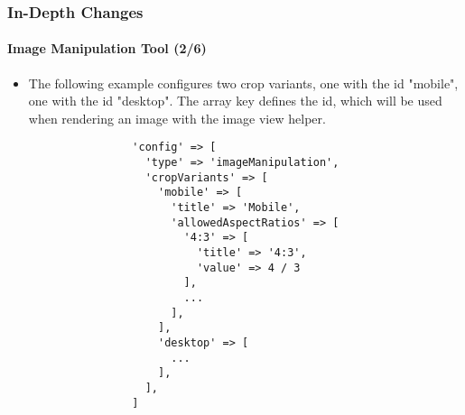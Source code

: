 
\begin{frame}[fragile]
	\frametitle{In-Depth Changes}
	\framesubtitle{Image Manipulation Tool (2/6)}

	\lstset{basicstyle=\tiny\ttfamily}

	\begin{itemize}

		\item The following example configures two crop variants,
			one with the id "mobile", one with the id "desktop".
			The array key defines the id, which will be used when
			rendering an image with the image view helper.

			\begin{lstlisting}
				'config' => [
				  'type' => 'imageManipulation',
				  'cropVariants' => [
				    'mobile' => [
				      'title' => 'Mobile',
				      'allowedAspectRatios' => [
				        '4:3' => [
				          'title' => '4:3',
				          'value' => 4 / 3
				        ],
				        ...
				      ],
				    ],
				    'desktop' => [
				      ...
				    ],
				  ],
				]
			\end{lstlisting}

	\end{itemize}

\end{frame}


